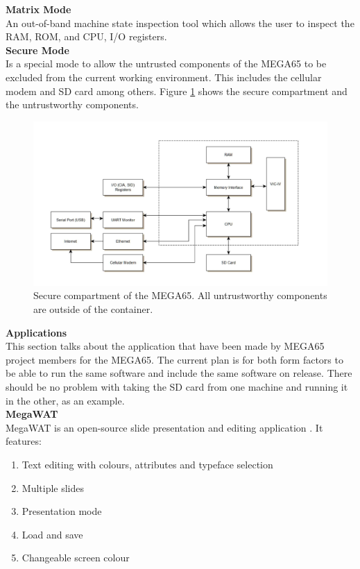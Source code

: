 \textbf{Matrix Mode}\\
An out-of-band machine state inspection tool which allows the user to inspect the RAM, ROM, and CPU, I/O registers.\\

\textbf{Secure Mode}\\
Is a special mode to allow the untrusted components of the MEGA65 to be excluded from the current working environment. This includes the cellular modem and SD card among others. Figure \ref{secure_compartment} shows the secure compartment and the untrustworthy components.\\

\begin{figure} \begin{center}
\includegraphics[width=.3\linewidth]{pics/secure_compartment} 
\end{center} 
\caption{Secure compartment of the MEGA65. All untrustworthy components are outside of the container.\\}
\label{secure_compartment}
\end{figure}

\textbf{Applications}\\
This section talks about the application that have been made by MEGA65 project members for the MEGA65. The current plan is for both form factors to be able to run the same software and include the same software on release. There should be no problem with taking the SD card from one machine and running it in the other, as an example.\\

\textbf{MegaWAT} \\
MegaWAT is an open-source slide presentation and editing application \cite{RN163}. It features:
\begin{enumerate}
\item Text editing with colours, attributes and typeface selection
\item Multiple slides
\item Presentation mode
\item Load and save
\item Changeable screen colour
\end{enumerate}

